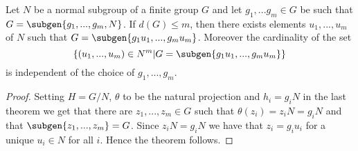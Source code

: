 \begin{theorem}
    \label{GaschutzT}
    Let $N$ be a normal subgroup of a finite group $G$ and let $g_1, ... g_m \in G$ be such that $G = \subgen{g_1, ..., g_m, N}$. 
    If $d(G) \le m$, then there exists elements $u_1, ..., u_m$ of $N$ such that $G = \subgen{g_1u_1, ..., g_mu_m}$. 
    Moreover the cardinality of the set $$\left\{(u_1,...,u_m) \in N^m | G = \subgen{g_1u_1, ..., g_mu_m} \right\}$$ is independent of the choice of $g_1, ..., g_m$.
\end{theorem}
\begin{proof}
    Setting $H = G/N$, $\theta$ to be the natural projection and $h_i = g_iN$ in the last theorem we get that there are $z_1, ..., z_m \in G$ such that $\theta(z_i) = z_iN = g_iN$ and that $\subgen{z_1, ..., z_m} = G$. Since $z_iN = g_iN$ we have that $z_i = g_iu_i$ for a unique $u_i \in N$ for all $i$. Hence the theorem follows.
\end{proof}
